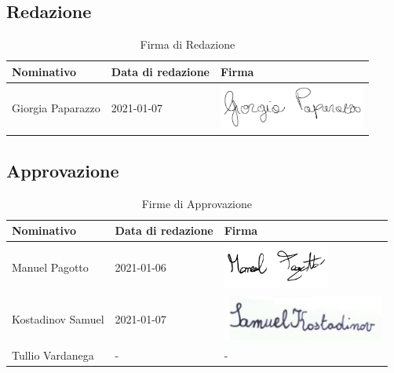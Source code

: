 \documentclass[../piano_di_progetto.tex]{subfiles}
\begin{document}
\subsection{Redazione}%
\label{sub:red}

\begin{table}[!ht]
	\centering
	\begin{tabular}{|l|l|l|}
		\hline
		\rowcolor{lightgray}
		\textbf{Nominativo} & \textbf{Data di redazione} & \textbf{Firma} \\ 
		\hline
			Giorgia Paparazzo & 2021-01-07& \includegraphics[height=1.5cm]{componenti/img/firma_gp} \\
		\hline
	\end{tabular}
	\caption{Firma di Redazione}
\end{table}


\subsection{Approvazione}%
\label{sub:app}

\begin{table}[!ht]
	\centering
	\begin{tabular}{|l|l|l|}
		\hline
		\rowcolor{lightgray}
		\textbf{Nominativo} & \textbf{Data di redazione} & \textbf{Firma} \\ 

		\hline
			Manuel Pagotto & 2021-01-06 & \includegraphics[height=1.5cm]{componenti/img/firma_mp} \\
		\hline
		Kostadinov Samuel & 2021-01-07 & \includegraphics[height=1.5cm]{componenti/img/firma_sk} \\
		\hline
			Tullio Vardanega & - & - \\
		\hline
	\end{tabular}
		\caption{Firme di Approvazione}
\end{table}


\newpage
\end{document}
